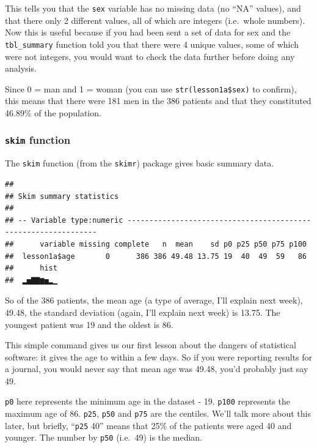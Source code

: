 \documentclass[]{book}
\newenvironment{Shaded}{\begin{snugshade}}{\end{snugshade}}
\newcommand{\KeywordTok}[1]{\textcolor[rgb]{0.13,0.29,0.53}{\textbf{#1}}}
\newcommand{\NormalTok}[1]{#1}
\newcommand{\OperatorTok}[1]{\textcolor[rgb]{0.81,0.36,0.00}{\textbf{#1}}}
\begin{document}
This tells you that the \texttt{sex} variable has no missing data (no ``NA'' values), and that there only 2 different values, all of which are integers (i.e.~whole numbers). Now this is useful because if you had been sent a set of data for sex and the \texttt{tbl\_summary} function told you that there were 4 unique values, some of which were not integers, you would want to check the data further before doing any analysis.

Since 0 = man and 1 = woman (you can use \texttt{str(lesson1a\$sex)} to confirm), this means that there were 181 men in the 386 patients and that they constituted 46.89\% of the population.

\hypertarget{skim-function}{%
\subsubsection{\texorpdfstring{\texttt{skim} function}{skim function}}\label{skim-function}}

The \texttt{skim} function (from the \texttt{skimr}) package gives basic summary data.

\begin{Shaded}
\end{Shaded}

\begin{verbatim}
## 
## Skim summary statistics
## 
## -- Variable type:numeric ---------------------------------------------------------------
##      variable missing complete   n  mean    sd p0 p25 p50 p75 p100
##  lesson1a$age       0      386 386 49.48 13.75 19  40  49  59   86
##      hist
##  ▂▅▇▇▆▅▂▁
\end{verbatim}

So of the 386 patients, the mean age (a type of average, I'll explain next week), 49.48, the standard deviation (again, I'll explain next week) is 13.75. The youngest patient was 19 and the oldest is 86.

This simple command gives us our first lesson about the dangers of statistical software: it gives the age to within a few days. So if you were reporting results for a journal, you would never say that mean age was 49.48, you'd probably just say 49.

\texttt{p0} here represents the minimum age in the dataset - 19. \texttt{p100} represents the maximum age of 86. \texttt{p25}, \texttt{p50} and \texttt{p75} are the centiles. We'll talk more about this later, but briefly, ``\texttt{p25} 40'' means that 25\% of the patients were aged 40 and younger. The number by \texttt{p50} (i.e.~49) is the median.
\end{document}
